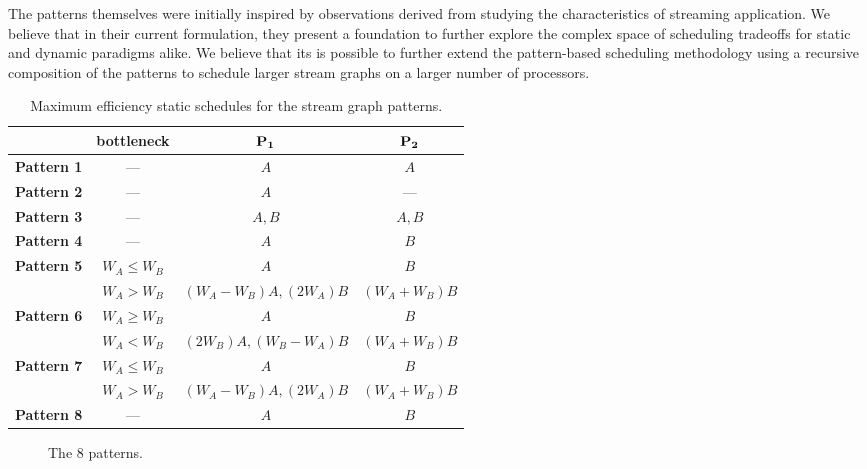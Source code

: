 The patterns themselves were initially inspired by observations
derived from studying the characteristics of streaming application. We
believe that in their current formulation, they present a foundation
to further explore the complex space of scheduling tradeoffs for
static and dynamic paradigms alike.  We believe that its is possible
to further extend the pattern-based scheduling methodology using a
recursive composition of the patterns to schedule larger stream graphs
on a larger number of processors.

\begin{table*}[t]
\center
\caption{\small Maximum efficiency static schedules for the stream graph patterns.}
{\small
\begin{tabular}{|c|c|c|c|} \hline
                 & {\bf bottleneck} & ${\bf P_1}$  & ${\bf P_2}$ \\ \hline
{\bf Pattern 1}  & ---              & $A$     & $A$ \\ \hline
{\bf Pattern 2}  & ---              & $A$     & --- \\ \hline
{\bf Pattern 3}  & ---              & $A, B$  & $A, B$ \\ \hline
{\bf Pattern 4}  & ---              & $A$     & $B$ \\ \hline
{\bf Pattern 5}  & $W_A \le W_B$    & $A$     & $B$ \\ \cline{2-4}
                 & $W_A > W_B$      & $(W_A - W_B) A, (2W_A) B$ & $(W_A + W_B) B$ \\ \hline
{\bf Pattern 6}  & $W_A \ge W_B$    & $A$     & $B$ \\ \cline{2-4}
                 & $W_A < W_B$      & $(2W_B) A, (W_B - W_A) B$ & $(W_A + W_B) B$ \\ \hline
{\bf Pattern 7}  & $W_A \le W_B$    & $A$     & $B$ \\ \cline{2-4}
                 & $W_A > W_B$      & $(W_A - W_B) A, (2W_A) B$ & $(W_A + W_B) B$ \\ \hline
{\bf Pattern 8}  & ---              & $A$     & $B$ \\ \hline
\end{tabular}}
\label{tab:pattern-sched}
\end{table*}


\begin{figure}[t!]
\begin{center}
\caption{{\small The 8 patterns.
\protect\label{fig:patterns}}}
\end{center}
\end{figure}

